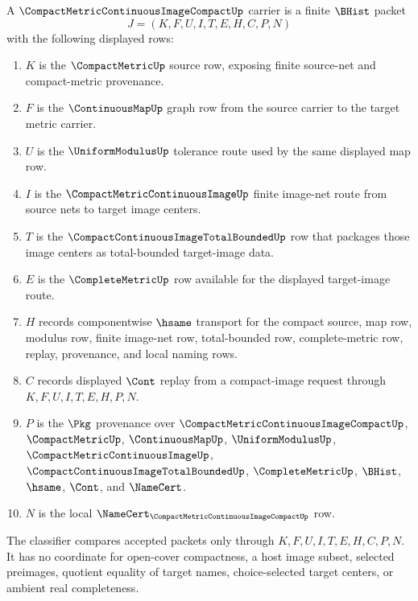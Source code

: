 \begin{definition}
\label{def:compact-metric-continuous-image-compact-carrier}
A $\CompactMetricContinuousImageCompactUp$ carrier is a finite $\BHist$ packet
$$
J=(K,F,U,I,T,E,H,C,P,N)
$$
with the following displayed rows:
\begin{enumerate}
\item $K$ is the $\CompactMetricUp$ source row, exposing finite source-net and compact-metric provenance.
\item $F$ is the $\ContinuousMapUp$ graph row from the source carrier to the target metric carrier.
\item $U$ is the $\UniformModulusUp$ tolerance route used by the same displayed map row.
\item $I$ is the $\CompactMetricContinuousImageUp$ finite image-net route from source nets to target image centers.
\item $T$ is the $\CompactContinuousImageTotalBoundedUp$ row that packages those image centers as total-bounded target-image data.
\item $E$ is the $\CompleteMetricUp$ row available for the displayed target-image route.
\item $H$ records componentwise $\hsame$ transport for the compact source, map row, modulus row, finite image-net row, total-bounded row, complete-metric row, replay, provenance, and local naming rows.
\item $C$ records displayed $\Cont$ replay from a compact-image request through $K,F,U,I,T,E,H,P,N$.
\item $P$ is the $\Pkg$ provenance over $\CompactMetricContinuousImageCompactUp$, $\CompactMetricUp$, $\ContinuousMapUp$, $\UniformModulusUp$, $\CompactMetricContinuousImageUp$, $\CompactContinuousImageTotalBoundedUp$, $\CompleteMetricUp$, $\BHist$, $\hsame$, $\Cont$, and $\NameCert$.
\item $N$ is the local $\NameCert_{\CompactMetricContinuousImageCompactUp}$ row.
\end{enumerate}
The classifier compares accepted packets only through $K,F,U,I,T,E,H,C,P,N$. It has no coordinate for open-cover compactness, a host image subset, selected preimages, quotient equality of target names, choice-selected target centers, or ambient real completeness.
\end{definition}


